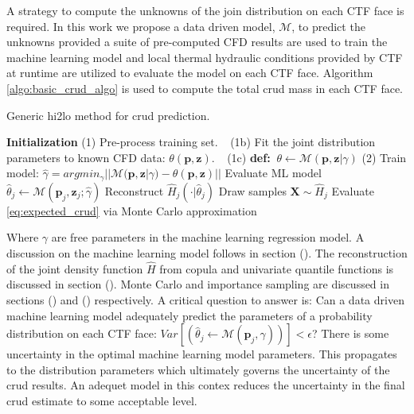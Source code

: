 A strategy to compute the unknowns of the join distribution on each CTF face is required.  In this work we propose a data driven model, $\mathcal M$, to predict the unknowns provided a suite of pre-computed CFD results are used to train the machine learning model and local thermal hydraulic conditions provided by CTF at runtime are utilized to evaluate the model on each CTF face. Algorithm \ref{algo:basic_crud_algo} is used to compute the total crud mass in each CTF face.

\begin{algorithm}[H]
    \caption{Generic hi2lo method for crud prediction.}
    \begin{algorithmic}      
    \STATE \textbf{Initialization}  
    \STATE (1) Pre-process training set.  
    \STATE $\ \ $   (1b) Fit the joint distribution parameters to known CFD data: $\theta(\mathbf p, \mathbf z)$.  
    \STATE $\ \ $   (1c) \textbf{def:}  $\ \theta \leftarrow \mathcal M(\mathbf p, \mathbf z | \gamma)$
    \STATE (2) Train model:  $\hat \gamma =  argmin_\gamma ||\mathcal M(\mathbf p, \mathbf z| \gamma) - \theta(\mathbf p, \mathbf z)|| $
    \STATE Evaluate ML model $\hat \theta_j \leftarrow \mathcal M(\mathbf p_{j}, \mathbf z_j; \hat \gamma)$ \;
    \STATE Reconstruct $\hat H_j(\cdot |\hat \theta_j)$ \;
    \STATE Draw samples $\mathbf X \sim \hat H_j$ \;
    \STATE Evaluate \ref{eq:expected_crud} via Monte Carlo approximation \;
\ENDFOR
    \end{algorithmic}
\label{algo:basic_crud_algo}
\end{algorithm}
Where $\gamma$ are free parameters in the machine learning regression model.  A discussion on the machine learning model follows in section ().  The reconstruction of the joint density function $\hat H$ from copula and univariate quantile functions is discussed in section ().  Monte Carlo and importance sampling are discussed in sections () and () respectively.  A critical question to answer is:  Can a data driven machine learning model adequately predict the parameters of a probability distribution on each CTF face: $Var[(\hat \theta_j \leftarrow \mathcal M(\mathbf p_{j}, \gamma))] < \epsilon$?  There is some uncertainty in the optimal machine learning model parameters.  This propagates to the distribution parameters which ultimately governs the uncertainty of the crud results.  An adequet model in this contex reduces the uncertainty in the final crud estimate to some acceptable level.
\bigskip

